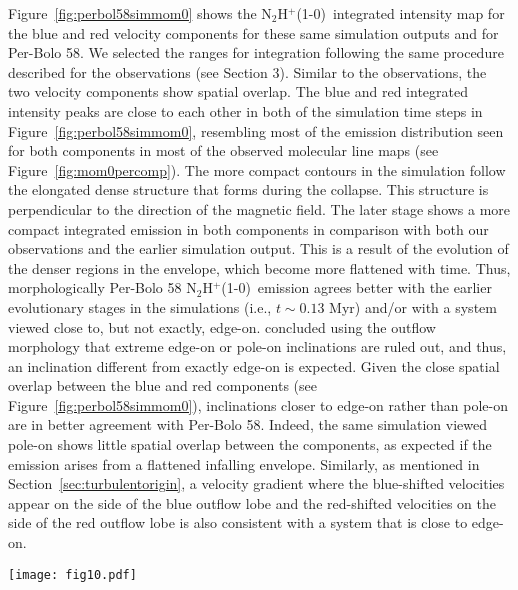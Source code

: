 \documentclass[iop]{emulateapj}
\newcommand{\kms}{\,~km~s$^{-1}$}
\newcommand{\nthp}{\mbox{\rm N$_2$H$^+$(1-0)}}
\begin{document}
Figure~\ref{fig:perbol58simmom0} shows the \nthp\ integrated intensity map for the blue and red velocity components for these same simulation outputs and for Per-Bolo 58. We selected the ranges for integration following the same procedure described for the observations (see Section 3). Similar to the observations, the two velocity components show spatial overlap. The blue and red integrated intensity peaks are close to each other in both of the simulation time steps in Figure~\ref{fig:perbol58simmom0}, resembling most of the emission distribution seen for both components in most of the observed molecular line maps (see Figure~\ref{fig:mom0percomp}). The more compact contours in the simulation follow the elongated dense structure that forms during the collapse. This structure is perpendicular to the direction of the magnetic field. The later stage shows a more compact integrated emission in both components in comparison with both our observations and the earlier simulation output. This is a result of the evolution of the denser regions in the envelope, which become more flattened with time. Thus, morphologically Per-Bolo 58 \nthp\ emission agrees better with the earlier evolutionary stages in the simulations (i.e., $t\sim0.13$ Myr) and/or with a system viewed close to, but not exactly, edge-on. \cite{2011DunhamDetection} concluded using the outflow morphology that extreme edge-on or pole-on inclinations are ruled out, and thus, an inclination different from exactly edge-on is expected. Given the close spatial overlap between the blue and red components (see Figure~\ref{fig:perbol58simmom0}), inclinations closer to edge-on rather than pole-on are in better agreement with Per-Bolo 58. Indeed, the same simulation viewed pole-on shows little spatial overlap between the components, as expected if the emission arises from a flattened infalling envelope. Similarly, as mentioned in Section~\ref{sec:turbulentorigin}, a velocity gradient where the blue-shifted velocities appear on the side of the blue outflow lobe and the red-shifted velocities on the side of the red outflow lobe is also consistent with a system that is close to edge-on. \\


\begin{figure*}
\center
\texttt{[image: fig10.pdf]}
\caption{Simulation and Per-Bolo 58 central velocity (left) and linewidth (right) maps for the blue and red peak in the spectra of \nthp. Values in these maps were obtained from a double Gaussian fit. Contours for the velocity maps are drawn from 7.1 \kms, increasing in steps of 0.05 \kms. Contours for the non-thermal over thermal linewidth ratio maps are drawn from 1, increasing in steps of 0.5. The blue and red arrows represent the outflow as in Figure~\ref{fig:perbol58mom0}. \label{fig:perbol58simallfits}}
\end{figure*}
\end{document}
